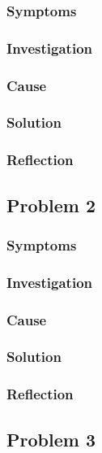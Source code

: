 \documentclass{article}[12pt]
\begin{document}
    \subsubsection{Symptoms}
    
    \subsubsection{Investigation}

    \subsubsection{Cause}

    \subsubsection{Solution}

    \subsubsection{Reflection}

    \subsection{Problem 2}
    \subsubsection{Symptoms}
    
    \subsubsection{Investigation}

    \subsubsection{Cause}

    \subsubsection{Solution}

    \subsubsection{Reflection}
    
    \subsection{Problem 3}    
\end{document}
